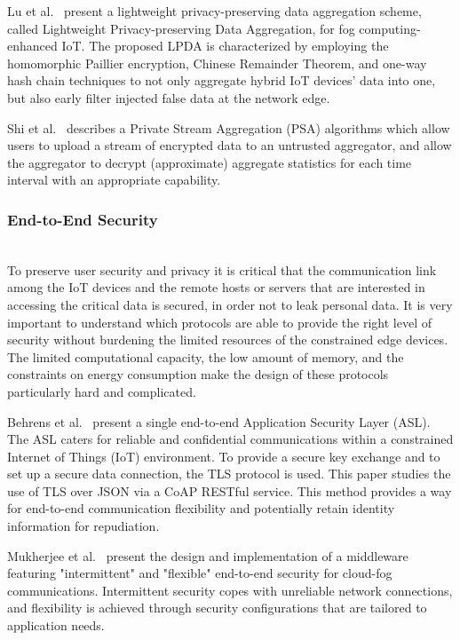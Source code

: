 Lu et al.~\cite{7869305} present a lightweight privacy-preserving data aggregation scheme, called Lightweight Privacy-preserving Data Aggregation, for fog computing-enhanced IoT. The proposed LPDA is characterized by employing the homomorphic Paillier encryption, Chinese Remainder Theorem, and one-way hash chain techniques to not only aggregate hybrid IoT devices' data into one, but also early filter injected false data at the network edge. 

Shi et al.~\cite{shi} describes a Private Stream Aggregation (PSA) algorithms which allow users to upload a stream of encrypted data to an untrusted aggregator, and allow the aggregator to decrypt (approximate) aggregate statistics for each time interval with an appropriate capability.

\subsubsection{End-to-End Security}
\hfill\\
To preserve user security and privacy it is critical that the communication link among the IoT devices and the remote hosts or servers that are interested in accessing the critical data is secured, in order not to leak personal data. It is very important to understand which protocols are able to provide the right level of security without burdening the limited resources of the constrained edge devices. The limited computational capacity, the low amount of memory, and the constraints on energy consumption make the design of these protocols particularly hard and complicated. 

Behrens et al.~\cite{7899405} present a single end-to-end Application Security Layer (ASL). The ASL caters for reliable and confidential communications within a constrained Internet of Things (IoT) environment. To provide a secure key exchange and to set up a secure data connection, the TLS protocol is used. This paper studies the use of TLS over JSON via a CoAP RESTful service. This method provides a way for end-to-end communication flexibility and potentially retain identity information for repudiation. 

Mukherjee et al.~\cite{7987191} present the design and implementation of a middleware featuring "intermittent" and "flexible" end-to-end security for cloud-fog communications. Intermittent security copes with unreliable network connections, and flexibility is achieved through security configurations that are tailored to application needs.

